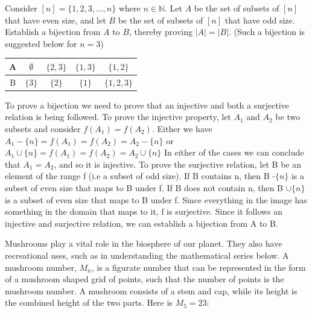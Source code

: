 \documentclass[addpoints]{exam}
\begin{document}
\begin{questions}
\question[15] Consider $[n] = \{1,2,3,...,n\}$ where $n \in \mathbb{N}$. Let $A$ be the set of subsets of $[n]$ that have even size, and let $B$ be the set of subsets of $[n]$ that have odd size. Establish a bijection from $A$ to $B$, thereby proving $|A| = |B|$. (Such a bijection is suggested below for $n = 3$) 

\begin{center}

  \begin{tabular}{ |c || c | c | c |c |}
    \hline
 A & $\emptyset$ & $\{2,3\}$ & $\{1,3\}$ & $\{1,2\}$ \\ \hline
 B & $\{3\}$ & $\{2\}$ & $\{1\}$ & $\{1,2,3\}$\\\hline
\end{tabular}
\end{center}

  \begin{solution}
    \newline
    To prove a bijection we need to prove that an injective and both a surjective relation is being followed.
    \newline
    To prove the injective property, let $A_1$ and $A_2$ be two subsets and consider $f(A_1)=f(A_2)$. Either we have 
    \newline
    $A_1 - \{n\} = f(A_1)=f(A_2)=A_2-\{n\}$
    \newline
    or
    \newline
    $A_1 \cup \{n\}= f(A_1)=f(A_2)=A_2 \cup \{n\}$
    \newline
    In either of the cases we can conclude that $A_1=A_2$, and so it is injective.
    \newline
    To prove the surjective relation, let B be an element of the range f (i.e a subset of odd size). If B contains n, then B -$\{n\}$ is a subset of even size that maps to B under f. If B does not contain n, then B $\cup \{n\}$ is a subset of even size that maps to B under f. 
    \newline
    Since everything in the image has something in the domain that maps to it, f is surjective.
    \newline
    Since it follows an injective and surjective relation, we can establish a bijection from A to B.
    
  \end{solution}
  
\question Mushrooms play a vital role in the biosphere of our planet. They also have recreational uses, such as in understanding the mathematical series below. A mushroom number, $M_n$, is a figurate number that can be represented in the form of a mushroom shaped grid of points, such that the number of points is the mushroom number. A mushroom consists of a stem and cap, while its height is the combined height of the two parts. Here is $M_5=23$:


\end{questions}
\end{document}
